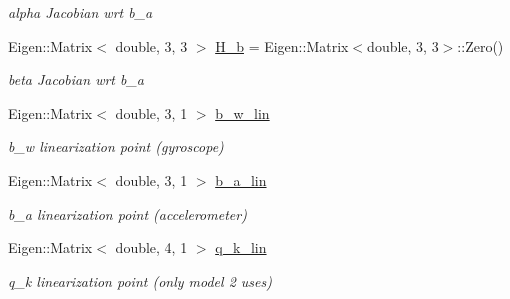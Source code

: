 \begin{DoxyCompactItemize}
\begin{DoxyCompactList}\small\item\em alpha Jacobian wrt b\+\_\+a \end{DoxyCompactList}\item 
\mbox{\label{classov__core_1_1CpiBase_aedaa626d4f2f506db3fe4a5222fede5a}} 
Eigen\+::\+Matrix$<$ double, 3, 3 $>$ \hyperlink{classov__core_1_1CpiBase_aedaa626d4f2f506db3fe4a5222fede5a}{H\+\_\+b} = Eigen\+::\+Matrix$<$double, 3, 3$>$\+::Zero()
\begin{DoxyCompactList}\small\item\em beta Jacobian wrt b\+\_\+a \end{DoxyCompactList}\item 
\mbox{\label{classov__core_1_1CpiBase_a36b8b84f53f08b62b55485ff06829f64}} 
Eigen\+::\+Matrix$<$ double, 3, 1 $>$ \hyperlink{classov__core_1_1CpiBase_a36b8b84f53f08b62b55485ff06829f64}{b\+\_\+w\+\_\+lin}
\begin{DoxyCompactList}\small\item\em b\+\_\+w linearization point (gyroscope) \end{DoxyCompactList}\item 
\mbox{\label{classov__core_1_1CpiBase_a013295bb1bb30db58c752c6c802cc08f}} 
Eigen\+::\+Matrix$<$ double, 3, 1 $>$ \hyperlink{classov__core_1_1CpiBase_a013295bb1bb30db58c752c6c802cc08f}{b\+\_\+a\+\_\+lin}
\begin{DoxyCompactList}\small\item\em b\+\_\+a linearization point (accelerometer) \end{DoxyCompactList}\item 
\mbox{\label{classov__core_1_1CpiBase_a8dedbf02f3a04d5cd66f88b9354ccfd1}} 
Eigen\+::\+Matrix$<$ double, 4, 1 $>$ \hyperlink{classov__core_1_1CpiBase_a8dedbf02f3a04d5cd66f88b9354ccfd1}{q\+\_\+k\+\_\+lin}
\begin{DoxyCompactList}\small\item\em q\+\_\+k linearization point (only model 2 uses) \end{DoxyCompactList}\item 
\mbox{\label{classov__core_1_1CpiBase_a43580d4c493d8b44a1c8cab9ad9b8a42}} 

\end{DoxyCompactItemize}
